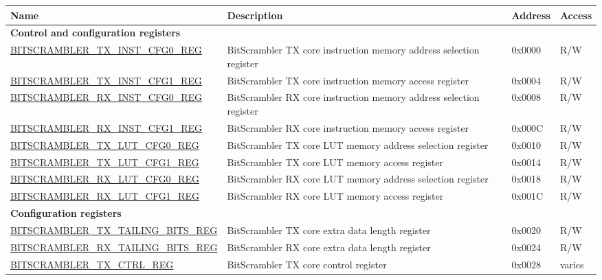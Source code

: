 \begin{longtable}{ | p{6.3cm} | p{7cm} | p{1.2cm} | p{1cm} | }
\hline\rowcolor{lightgray}
Name & Description &  Address & Access \\ \hline
\endhead
\multicolumn{4}{|l|}{\textbf{Control and configuration registers}} \\ \hline
\hyperref[regdesc:BITSCRAMBLERTXINSTCFG0REG]{BITSCRAMBLER\_TX\_INST\_CFG0\_REG} & BitScrambler TX core instruction memory address selection register & 0x0000 & R/W \\ \hline
\hyperref[regdesc:BITSCRAMBLERTXINSTCFG1REG]{BITSCRAMBLER\_TX\_INST\_CFG1\_REG} & BitScrambler TX core instruction memory access register & 0x0004 & R/W \\ \hline
\hyperref[regdesc:BITSCRAMBLERRXINSTCFG0REG]{BITSCRAMBLER\_RX\_INST\_CFG0\_REG} & BitScrambler RX core instruction memory address selection register & 0x0008 & R/W \\ \hline
\hyperref[regdesc:BITSCRAMBLERRXINSTCFG1REG]{BITSCRAMBLER\_RX\_INST\_CFG1\_REG} & BitScrambler RX core instruction memory access register & 0x000C & R/W \\ \hline
\hyperref[regdesc:BITSCRAMBLERTXLUTCFG0REG]{BITSCRAMBLER\_TX\_LUT\_CFG0\_REG} & BitScrambler TX core LUT memory address selection register & 0x0010 & R/W \\ \hline
\hyperref[regdesc:BITSCRAMBLERTXLUTCFG1REG]{BITSCRAMBLER\_TX\_LUT\_CFG1\_REG} & BitScrambler TX core LUT memory access register & 0x0014 & R/W \\ \hline
\hyperref[regdesc:BITSCRAMBLERRXLUTCFG0REG]{BITSCRAMBLER\_RX\_LUT\_CFG0\_REG} & BitScrambler RX core LUT memory address selection register & 0x0018 & R/W \\ \hline
\hyperref[regdesc:BITSCRAMBLERRXLUTCFG1REG]{BITSCRAMBLER\_RX\_LUT\_CFG1\_REG} & BitScrambler RX core LUT memory access register & 0x001C & R/W \\ \hline
\multicolumn{4}{|l|}{\textbf{Configuration registers}} \\ \hline
\hyperref[regdesc:BITSCRAMBLERTXTAILINGBITSREG]{BITSCRAMBLER\_TX\_TAILING\_BITS\_REG} & BitScrambler TX core extra data length register & 0x0020 & R/W \\ \hline
\hyperref[regdesc:BITSCRAMBLERRXTAILINGBITSREG]{BITSCRAMBLER\_RX\_TAILING\_BITS\_REG} & BitScrambler RX core extra data length register & 0x0024 & R/W \\ \hline
\hyperref[regdesc:BITSCRAMBLERTXCTRLREG]{BITSCRAMBLER\_TX\_CTRL\_REG} & BitScrambler TX core control register & 0x0028 & varies \\ \hline

\end{longtable}
